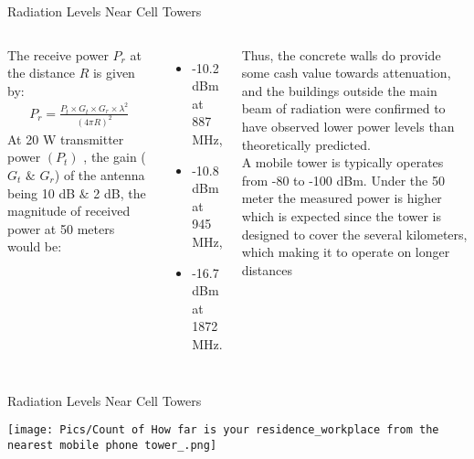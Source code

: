 \documentclass[7pt, aspectratio=169]{beamer}
\begin{document}
\begin{frame}{Radiation Levels Near Cell Towers}
\begin{columns}
    The receive power \(P_r\) at the distance \(R\) is given by\autocite{kumar2009biological}:
    \begin{align*}
        P_r = \frac{P_t \times G_t \times G_r \times \lambda^2}{(4\pi R)^2}
    \end{align*}
    At 20 W transmitter power \((P_t)\) , the gain (\(G_t\) \(\&\) \(G_r\)) of the antenna being 10 dB \(\&\) 2 dB, the magnitude of received power at 50 meters would be:
        \begin{itemize}
        \item -10.2 dBm at 887 MHz,
        \item -10.8 dBm at 945 MHz,
        \item -16.7 dBm at 1872 MHz.
    \end{itemize}
    
    Thus, the concrete walls do provide some cash value towards attenuation, and the buildings outside the main beam of radiation were confirmed to have observed lower power levels than theoretically predicted.\\
    \vspace{0.2cm}
    A mobile tower is typically operates from -80 to -100 dBm. Under the 50 meter the measured power is higher which is expected since the tower is designed to cover the several kilometers, which making it to operate on longer distances
\end{columns}
    
\end{frame}
\begin{frame}{Radiation Levels Near Cell Towers}
    \begin{center}
        \texttt{[image: Pics/Count of How far is your residence\_workplace from the nearest mobile phone tower\_.png]}\\
    \end{center}
    
\end{frame}
\end{document}
